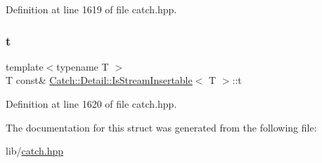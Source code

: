 Definition at line 1619 of file catch.\+hpp.

\hypertarget{struct_catch_1_1_detail_1_1_is_stream_insertable_a7d2a3da978b6736667a7b2f6d51f507f}{}\label{struct_catch_1_1_detail_1_1_is_stream_insertable_a7d2a3da978b6736667a7b2f6d51f507f} 
\subsubsection{\texorpdfstring{t}{t}}
{\footnotesize\ttfamily template$<$typename T $>$ \\
T const\& \hyperlink{struct_catch_1_1_detail_1_1_is_stream_insertable}{Catch\+::\+Detail\+::\+Is\+Stream\+Insertable}$<$ T $>$\+::t\hspace{0.3cm}{\ttfamily [static]}}



Definition at line 1620 of file catch.\+hpp.



The documentation for this struct was generated from the following file\+:\begin{DoxyCompactItemize}
\item 
lib/\hyperlink{catch_8hpp}{catch.\+hpp}\end{DoxyCompactItemize}
